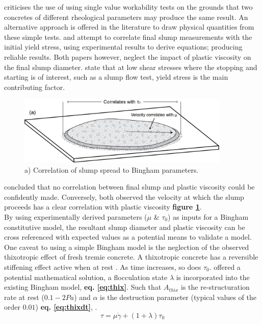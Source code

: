 \newline
\noindent
\citet{wallevik06} criticises the use of using single value workability tests on the grounds that two concretes of different rheological parameters may produce the same result. An alternative approach is offered in the literature to draw physical quantities from these simple tests. \citet{roussel50} and \citet{wallevik06} attempt to correlate final slump measurements with the initial yield stress, using experimental results to derive equations; producing reliable results. Both papers however, neglect the impact of plastic viscosity on the final slump diameter. \citet{sofcf} state that at low shear stresses where the stopping and starting is of interest, such as a slump flow test, yield stress is the main contributing factor.\\
\begin{figure}[H]
\centering
\includegraphics[width=0.9\textwidth]{tau.png}
\caption{\label{fig:tau} a) Correlation of slump spread to Bingham parameters.}
\end{figure}
\noindent
\citet{wallevik06} concluded that no correlation between final slump and plastic viscosity could be confidently made. Conversely, \citet{TUM,BOUVET10} both observed the velocity at which the slump proceeds has a clear correlation with plastic viscosity {\bfseries figure \ref{fig:tau}}.\\
\newline
\noindent
By using experimentally derived parameters ($\mu$ \& $\tau_0$) as inputs for a Bingham constitutive model, the resultant slump diameter and plastic viscosity can be cross referenced with expected values as a potential means to validate a model.\\
\newline
One caveat to using a simple Bingham model is the neglection of the observed thixotropic effect of fresh tremie concrete. A thixotropic concrete has a reversible stiffening effect active when at rest \citep{EFFC}. As time increases, so does $\tau_0$. \citet{roussel06} offered a potential mathematical solution, a flocculation state $\lambda$ is incorporated into the existing Bingham model, {\bfseries eq. \ref{eq:thix}}. Such that $A_{thix}$ is the re-structuration rate at rest ($0.1-2 Pa$) and $\alpha$ is the destruction parameter (typical values of the order $0.01$) {\bfseries eq. \ref{eq:thixdt}}, \citet{roussel07}.
\begin{equation}
\tau = \mu\dot{\gamma}+(1+\lambda)\tau_0
\label{eq:thix}
\end{equation}

